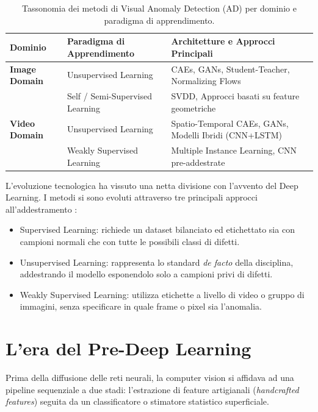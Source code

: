 \begin{table}[htbp]
\centering
\small
\caption{Tassonomia dei metodi di Visual Anomaly Detection (AD) per dominio e paradigma di apprendimento.}
\label{tab:taxonomy}
\begin{tabular}{l|l|l}
\hline
\textbf{Dominio} & \textbf{Paradigma di Apprendimento} & \textbf{Architetture e Approcci Principali} \\ \hline
\textbf{Image Domain} & Unsupervised Learning & CAEs, GANs, Student-Teacher, Normalizing Flows \\
                      & Self / Semi-Supervised Learning & SVDD, Approcci basati su feature geometriche \\ \hline
\textbf{Video Domain} & Unsupervised Learning & Spatio-Temporal CAEs, GANs, Modelli Ibridi (CNN+LSTM) \\
                      & Weakly Supervised Learning & Multiple Instance Learning, CNN pre-addestrate \\ \hline
\end{tabular}
\end{table}
    
L'evoluzione tecnologica ha vissuto una netta divisione con l'avvento del Deep Learning. I metodi si sono evoluti attraverso tre principali approcci all'addestramento \cite{Cui_et_al._2023}:
\begin{itemize}
    \item Supervised Learning: richiede un dataset bilanciato ed etichettato sia con campioni normali che con tutte le possibili classi di difetti.
    \item Unsupervised Learning: rappresenta lo standard \textit{de facto} della disciplina, addestrando il modello esponendolo solo a campioni privi di difetti.
    \item Weakly Supervised Learning: utilizza etichette a livello di video o gruppo di immagini, senza specificare in quale frame o pixel sia l'anomalia.
\end{itemize} 

\section{L'era del Pre-Deep Learning}
Prima della diffusione delle reti neurali, la computer vision si affidava ad una pipeline sequenziale a due stadi: l'estrazione di feature artigianali (\textit{handcrafted features}) seguita da un classificatore o stimatore statistico superficiale.\cite{Yang_et_al._2021}

